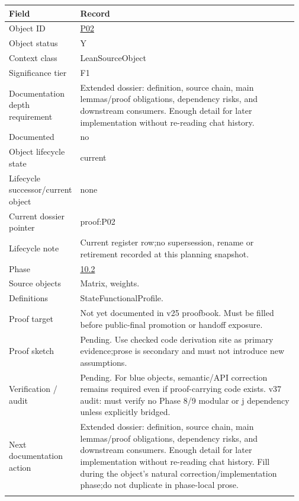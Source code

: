 \begin{longtable}{L{0.16\linewidth} L{0.81\linewidth}}
\hline
\textbf{Field} & \textbf{Record}\\
\hline
Object ID & \hyperlink{object-row-P02}{P02}\\
\hline\addlinespace[0.20em]
Object status & Y\\
\hline\addlinespace[0.20em]
Context class & LeanSourceObject\\
\hline\addlinespace[0.20em]
Significance tier & F1\\
\hline\addlinespace[0.20em]
Documentation depth requirement & Extended dossier: definition, source chain, main lemmas/\allowbreak{}proof obligations, dependency risks, and downstream consumers. Enough detail for later implementation without re-reading chat history.\\
\hline\addlinespace[0.20em]
Documented & no\\
\hline\addlinespace[0.20em]
Object lifecycle state & current\\
\hline\addlinespace[0.20em]
Lifecycle successor/\allowbreak{}current object & none\\
\hline\addlinespace[0.20em]
Current dossier pointer & proof:P02\\
\hline\addlinespace[0.20em]
Lifecycle note & Current register row;\newline no supersession, rename or retirement recorded at this planning snapshot.\\
\hline\addlinespace[0.20em]
Phase & \hyperlink{phase-row-10-2}{10.2}\\
\hline\addlinespace[0.20em]
Source objects & Matrix, weights.\\
\hline\addlinespace[0.20em]
Definitions & StateFunctionalProfile.\\
\hline\addlinespace[0.20em]
Proof target & Not yet documented in v25 proofbook. Must be filled before public-final promotion or handoff exposure.\\
\hline\addlinespace[0.20em]
Proof sketch & Pending. Use checked code derivation site as primary evidence;\newline prose is secondary and must not introduce new assumptions.\\
\hline\addlinespace[0.20em]
Verification /\allowbreak{} audit & Pending. For blue objects, semantic/\allowbreak{}API correction remains required even if proof-carrying code exists. v37 audit: must verify no Phase 8/\allowbreak{}9 modular or j dependency unless explicitly bridged.\\
\hline\addlinespace[0.20em]
Next documentation action & Extended dossier: definition, source chain, main lemmas/\allowbreak{}proof obligations, dependency risks, and downstream consumers. Enough detail for later implementation without re-reading chat history. Fill during the object's natural correction/\allowbreak{}implementation phase;\newline do not duplicate in phase-local prose.\\
\hline\addlinespace[0.20em]
\end{longtable}
